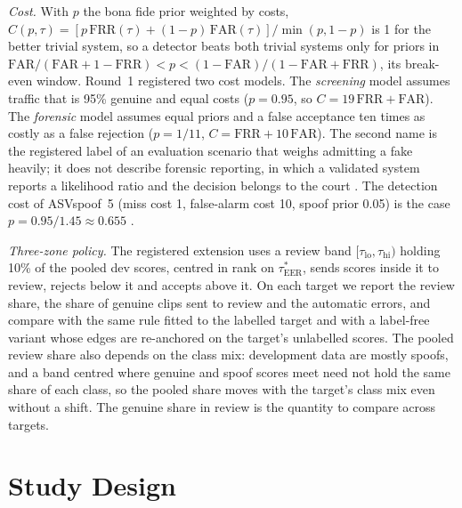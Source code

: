 \documentclass[review,authoryear]{elsarticle}
\newcommand{\frr}{\mathrm{FRR}}
\newcommand{\far}{\mathrm{FAR}}
\newcommand{\tauE}{\tau^{*}_{\mathrm{EER}}}
\begin{document}
\emph{Cost.}\label{eq:cost} With \(p\) the bona fide prior weighted by costs, \(C(p,\tau)=[p\,\frr(\tau)+(1-p)\,\far(\tau)]/\min(p,1-p)\)
is 1 for the better trivial system, so a detector beats both trivial systems only for priors in
\(\far/(\far+1-\frr)<p<(1-\far)/(1-\far+\frr)\), its break-even window. Round~1 registered two cost models. The
\emph{screening} model assumes traffic that is 95\% genuine and equal costs (\(p=0.95\), so \(C=19\,\frr+\far\)). The
\emph{forensic} model assumes equal priors and a false acceptance ten times as costly as a false rejection
(\(p=1/11\), \(C=\frr+10\,\far\)). The second name is the registered label of an evaluation scenario that weighs
admitting a fake heavily; it does not describe forensic reporting, in which a validated system reports a likelihood
ratio and the decision belongs to the court \citep{morrison21_consensus}. The detection cost of ASVspoof~5 (miss cost 1,
false-alarm cost 10, spoof prior 0.05) is the case \(p=0.95/1.45\approx0.655\) \citep{wang24_asvspoof5}.

\emph{Three-zone policy.} The registered extension uses a review band \([\tau_{\mathrm{lo}},\tau_{\mathrm{hi}})\) holding 10\% of the pooled dev scores,
centred in rank on \(\tauE\), sends scores inside it to review, rejects below it and accepts above it. On each target we
report the review share, the share of genuine clips sent to review and the automatic errors, and compare with the same
rule fitted to the labelled target and with a label-free variant whose edges are re-anchored on the target's unlabelled
scores. The pooled review share also depends on the class mix: development data are mostly spoofs, and a band centred
where genuine and spoof scores meet need not hold the same share of each class, so the pooled share moves with the
target's class mix even without a shift. The genuine share in review is the quantity to compare across targets.

\section{Study Design}
\label{sec:design}
\end{document}

